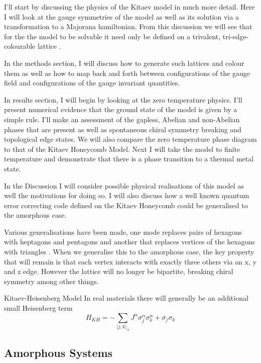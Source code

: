 I'll start by discussing the physics of the Kitaev model in much more detail. Here I will look at the gauge symmetries of the model as well as its solution via a transformation to a Majorana hamiltonian. From this discussion we will see that for the the model to be solvable it need only be defined on a trivalent, tri-edge-colourable lattice \autocite{Nussinov2009}.

In the methods section, I will discuss how to generate such lattices and colour them as well as how to map back and forth between configurations of the gauge field and configurations of the gauge invariant quantities.

In results section, I will begin by looking at the zero temperature physics. I'll present numerical evidence that the ground state of the model is given by a simple rule. I'll make an assessment of the gapless, Abelian and non-Abelian phases that are present as well as spontaneous chiral symmetry breaking and topological edge states. We will also compare the zero temperature phase diagram to that of the Kitaev Honeycomb Model. Next I will take the model to finite temperature and demonstrate that there is a phase transition to a thermal metal state.

In the Discussion I will consider possible physical realisations of this model as well the motivations for doing so. I will also discuss how a well known quantum error correcting code defined on the Kitaev Honeycomb could be generalised to the amorphous case.

Various generalisations have been made, one mode replaces pairs of hexagons with heptagons and pentagons \cite{periNonAbelianChiralSpin2020} and another that replaces vertices of the hexagons with triangles \cite{yaoExactChiralSpin2007}. When we generalise this to the amorphous case, the key property that will remain is that each vertex interacts with exactly three others via an x, y and z edge. However the lattice will no longer be bipartite, breaking chiral symmetry among other things.

Kitaev-Heisenberg Model In real materials there will generally be an additional small Heisenberg term \[H_{KH} =  - \sum_{\langle j,k\rangle_\alpha} J^{\alpha}\sigma_j^{\alpha}\sigma_k^{\alpha} + \sigma_j\sigma_k\]

\hypertarget{amorphous-systems}{%
\subsection{Amorphous Systems}\label{amorphous-systems}}


